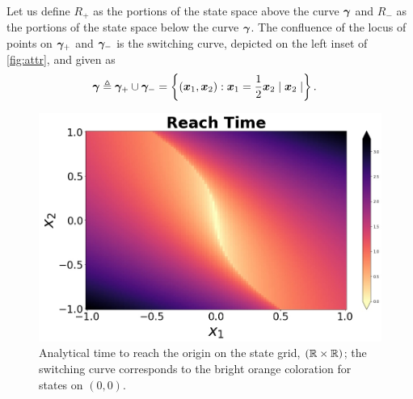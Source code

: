 Let us define $R_+$ as the portions of the state space above the curve $\bm{\gamma}$ and $R_-$ as the portions of the state space below the curve $\bm{\gamma}$.  The confluence of the locus of points on $\bm{\gamma}_+$ and $\bm{\gamma}_-$ is the switching curve, depicted on the left inset of \autoref{fig:attr}, and given as
%
\begin{align}
	\bm{\gamma} \triangleq \bm{\gamma}_+ \cup \bm{\gamma}_- &= \left\{(\bm{x}_1, \bm{x}_2): \bm{x}_1 = \frac{1}{2}\bm{x}_2 \mid \bm{x}_2 \mid \right\}.
\end{align}
%
\begin{figure}[tb!]
	\centering
	\begin{minipage}[b]{.5\textwidth}
		\includegraphics[width=1.0\textwidth]{figures/attr.jpg}
	\end{minipage}
	\caption{\footnotesize %
		Analytical time to reach the origin on the state grid, $\left(\mathbb{R} \times \mathbb{R}\right)$; the switching curve corresponds to the bright orange coloration for states on $(0,0)$.}
	\label{fig:attr}
\end{figure}
%
